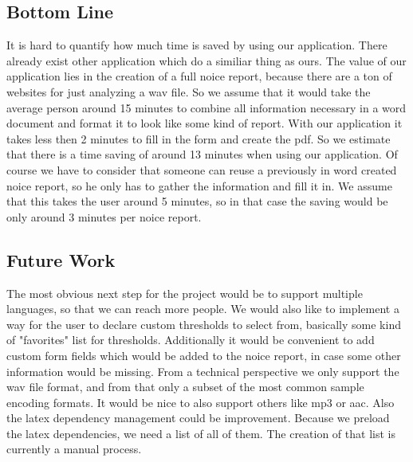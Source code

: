 \subsection{Bottom Line}
It is hard to quantify how much time is saved by using our application. There already exist other application which do a similiar thing as ours. The value of our application lies in the creation of a full noice report, because there are a ton of websites for just analyzing a wav file. So we assume that it would take the average person around 15 minutes to combine all information necessary in a word document and format it to look like some kind of report. With our application it takes less then 2 minutes to fill in the form and create the pdf. So we estimate that there is a time saving of around 13 minutes when using our application. Of course we have to consider that someone can reuse a previously in word created noice report, so he only has to gather the information and fill it in. We assume that this takes the user around 5 minutes, so in that case the saving would be only around 3 minutes per noice report.

\subsection{Future Work}
The most obvious next step for the project would be to support multiple languages, so that we can reach more people. We would also like to implement a way for the user to declare custom thresholds to select from, basically some kind of "favorites" list for thresholds. Additionally it would be convenient to add custom form fields which would be added to the noice report, in case some other information would be missing. From a technical perspective we only support the wav file format, and from that only a subset of the most common sample encoding formats. It would be nice to also support others like mp3 or aac. Also the latex dependency management could be improvement. Because we preload the latex dependencies, we need a list of all of them. The creation of that list is currently a manual process.